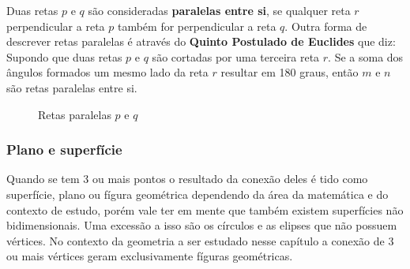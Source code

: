 \begin{multicols*}{2}

    Duas retas $p$ e $q$ são consideradas \textbf{paralelas entre si}, se qualquer reta $r$ perpendicular a reta $p$ também for
    perpendicular a reta $q$. Outra forma de descrever retas paralelas é através do \textbf{Quinto Postulado de Euclides}
    que diz: Supondo que duas retas $p$ e $q$ são cortadas por uma terceira reta $r$. Se a soma dos ângulos formados um
    mesmo lado da reta $r$ resultar em 180 graus, então $m$ e $n$ são retas paralelas entre si.

    \begin{figure}[H]
        \centering
        \caption{Retas paralelas $p$ e $q$}
    \end{figure}



    \subsubsection{Plano e superfície}
    Quando se tem 3 ou mais pontos o resultado da conexão deles é tido como superfície, plano ou fígura geométrica
    dependendo da área da matemática e do contexto de estudo, porém vale ter em mente que também existem superfícies
    não bidimensionais. Uma excessão a isso são os círculos e as elipses que não possuem vértices. No contexto da
    geometria a ser estudado nesse capítulo a conexão de 3 ou mais vértices geram exclusivamente fíguras geométricas.


\end{multicols*}
